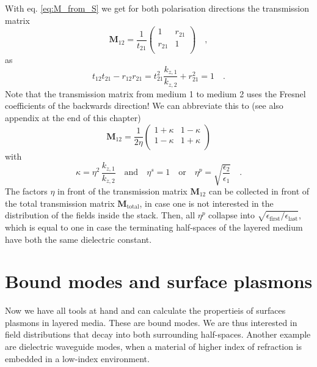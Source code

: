 With eq. \ref{eq:M_from_S} we get for both polarisation directions the transmission matrix
\begin{equation}
\mathbf{M}_{12} = \frac{1}{t_{21}} 
\begin{pmatrix}
1 & r_{21} \\ r_{21} & 1 \\
\end{pmatrix} \quad ,
\end{equation}
as 
\begin{equation}
t_{12} t_{21} - r_{12}r_{21} = t_{21}^2 \frac{k_{z,1}}{k_{z,2}} + r_{21}^2 = 1 \quad . 
\end{equation}
Note that the transmission matrix from medium 1 to medium 2 uses the Fresnel coefficients of the backwards direction!
We can abbreviate this to (see also appendix at the end of this chapter)
\begin{equation}
\mathbf{M}_{12} 
=\frac{ 1}{2 \eta }
\begin{pmatrix}
1 + \kappa & 1  -\kappa \\  1  - \kappa  & 1 + \kappa \\
\end{pmatrix} \label{eq:M_kappa}
\end{equation}
with 
\begin{equation}
\kappa = \eta^2 \,
\frac{  k_{z,1} }{ k_{z,2}}
\quad
\text{and}
\quad
\eta^s = 1 \quad \text{or} \quad \eta^p = \sqrt{ \frac{\epsilon_2}{\epsilon_1} } \quad . 
\end{equation}
The factors $\eta$ in front of the transmission matrix $\mathbf{M}_{12} $ can be collected in front of the total transmission matrix $\mathbf{M}_\text{total}$, in case one is not interested in the distribution of the fields inside the stack. Then, all $\eta^p$ collapse into $\sqrt{\epsilon_\text{first} / \epsilon_\text{last}}$, which is equal to one in case the terminating half-spaces of the layered medium have both the same dielectric constant. 



\section{Bound modes and surface plasmons}

Now we have all tools at hand and can calculate the propertieis of surfaces plasmons in layered media. These are bound modes. We are thus interested in field distributions that decay into both surrounding half-spaces. Another example are  dielectric waveguide modes, when a material of higher index of refraction is embedded in a low-index environment.

